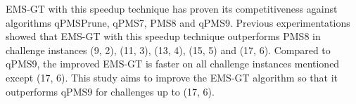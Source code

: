 	
	
	EMS-GT with this speedup technique has proven its competitiveness against algorithms qPMSPrune, qPMS7, PMS8 and qPMS9. Previous experimentations showed that EMS-GT with this speedup technique outperforms PMS8 in challenge instances (9, 2), (11, 3), (13, 4), (15, 5) and (17, 6). Compared to qPMS9, the improved EMS-GT is faster on all challenge instances mentioned except (17, 6). This study aims to improve the EMS-GT algorithm so that it outperforms qPMS9 for challenges up to (17, 6).

